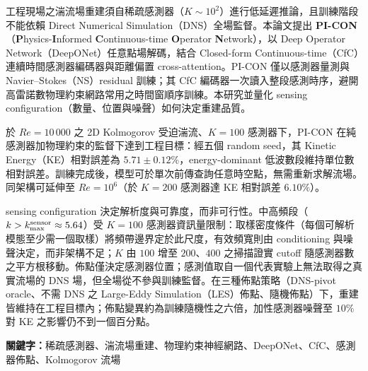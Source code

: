
工程現場之湍流場重建須自稀疏感測器（$K \sim 10^2$）進行低延遲推論，且訓練階段不能依賴 Direct Numerical Simulation（DNS）全場監督。本論文提出 \textbf{PI-CON}（\textbf{P}hysics-\textbf{I}nformed \textbf{C}ontinuous-time \textbf{O}perator \textbf{N}etwork），以 Deep Operator Network（DeepONet）任意點場解碼，結合 Closed-form Continuous-time（CfC）連續時間感測器編碼器與距離偏置 cross-attention。PI-CON 僅以感測器量測與 Navier--Stokes（NS）residual 訓練；其 CfC 編碼器一次讀入整段感測時序，避開高雷諾數物理約束網路常用之時間窗順序訓練。本研究並量化 sensing configuration（數量、位置與噪聲）如何決定重建品質。

於 $Re=10\,000$ 之 2D Kolmogorov 受迫湍流、$K=100$ 感測器下，PI-CON 在純感測器加物理約束的監督下達到工程目標：經五個 random seed，其 Kinetic Energy（KE）相對誤差為 $\mathbf{5.71 \pm 0.12\%}$，energy-dominant 低波數段維持單位數相對誤差。訓練完成後，模型可於單次前傳查詢任意時空點，無需重新求解流場。同架構可延伸至 $Re=10^6$（於 $K=200$ 感測器達 KE 相對誤差 $6.10\%$）。

sensing configuration 決定解析度與可靠度，而非可行性。中高頻段（$k > k_{\max}^{\rm sensor}\approx 5.64$）受 $K=100$ 感測器資訊量限制：取樣密度條件（每個可解析模態至少需一個取樣）將頻帶邊界定於此尺度，有效頻寬則由 conditioning 與噪聲決定，而非架構不足；$K$ 由 $100$ 增至 $200$、$400$ 之掃描證實 cutoff 隨感測器數之平方根移動。佈點僅決定感測器位置；感測值取自一個代表實驗上無法取得之真實流場的 DNS 場，但全場從不參與訓練監督。在三種佈點策略（DNS-pivot oracle、不需 DNS 之 Large-Eddy Simulation（LES）佈點、隨機佈點）下，重建皆維持在工程目標內；佈點變異約為訓練隨機性之六倍，加性感測器噪聲至 $10\%$ 對 KE 之影響仍不到一個百分點。

\smallskip

\noindent\textbf{關鍵字：}稀疏感測器、湍流場重建、物理約束神經網路、DeepONet、CfC、感測器佈點、Kolmogorov 流場
